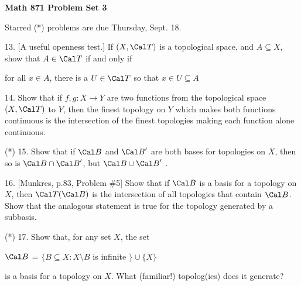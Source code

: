 


\def\ctln{\centerline}
\def\msk{\medskip}
\def\bsk{\bigskip}
\def\ssk{\smallskip}
\def\ra{\rightarrow}
\def\ubr{\underbar}

\UseAMSsymbols

\ctln{\bf Math 871 Problem Set 3}

\msk

Starred (*) problems are due Thursday, Sept. 18.

\bsk

\item{13.} [A useful openness test.] If $(X,{\Cal T})$ is a topological space, 
and $A\subseteq X$,  show that $A\in {\Cal T}$ if and only if

\ssk

\ctln{for all $x\in A$, there is a $U\in {\Cal T}$ so that $x\in U\subseteq A$}

\msk

\item{14.} Show that if $f,g:X\ra Y$ are two functions from the topological
space $(X,{\Cal T})$ to $Y$, then the finest topology on $Y$ which makes
both functions continuous is the intersection of the finest topologies
making each function alone continuous.

\msk

\item{(*)} 15. Show that if ${\Cal B}$ and ${\Cal B}^\prime$ are both 
bases for topologies on $X$, then so is
${\Cal B}\cap{\Cal B}^\prime$, but ${\Cal B}\cup{\Cal B}^\prime$ 
\ubr{need} \ubr{not} \ubr{be}.

\msk

\item{16.} [Munkres, p.83, Problem \#5] Show that if ${\Cal B}$ is a basis for a 
topology on $X$, then ${\Cal T}({\Cal B})$ is the intersection of all topologies 
that contain ${\Cal B}$. Show that the analogous statement is true for the topology
generated by a subbasis.

\msk

\item{(*)} 17. Show that, for any set $X$, the set

\smallskip

\centerline{$\Cal B$ = $\big\{B\subseteq X : X\setminus B$ is infinite $\bigr\}
\cup\bigl\{ X \bigr\}$}

\smallskip

is a basis for a topology on $X$. What (familiar!) topolog(ies) does it generate?

